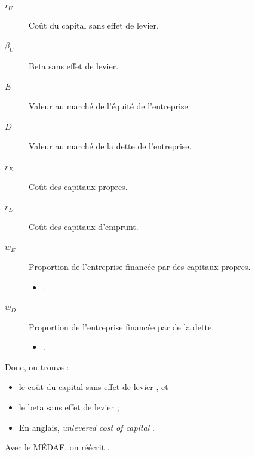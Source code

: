 \documentclass[10pt, french]{article}
\begin{document}
\begin{multicols*}{2}
\begin{definitionNOHFILLsub}
\begin{distributions}[Notation]
\begin{description}
	\item[$r_{U}$]	Coût du capital sans effet de levier.
	\item[$\beta_{U}$]	Beta sans effet de levier.
	\item[$E$]	Valeur au marché de l'équité de l'entreprise.
	\item[$D$]	Valeur au marché de la dette de l'entreprise.
	\item[$r_{E}$]	Coût des capitaux propres.
	\item[$r_{D}$]	Coût des capitaux d'emprunt.
	\item[$w_{E}$]	Proportion de l'entreprise financée par des capitaux propres.
		\begin{itemize}
		\item	{}.
		\end{itemize}
	\item[$w_{D}$]	Proportion de l'entreprise financée par de la dette.
		\begin{itemize}
		\item	{}.
		\end{itemize}
\end{description}
\end{distributions}

Donc, on trouve : 
\begin{itemize}
	\item	le coût du capital sans effet de levier , et 
	\item	le beta sans effet de levier  ;
	\item	En anglais, \og \textit{unlevered cost of capital} \fg{}.
\end{itemize}
\end{definitionNOHFILLsub}

\begin{definitionNOHFILLprop}
Avec le MÉDAF, on réécrit .\\
\end{definitionNOHFILLprop}


\end{multicols*}
\end{document}
